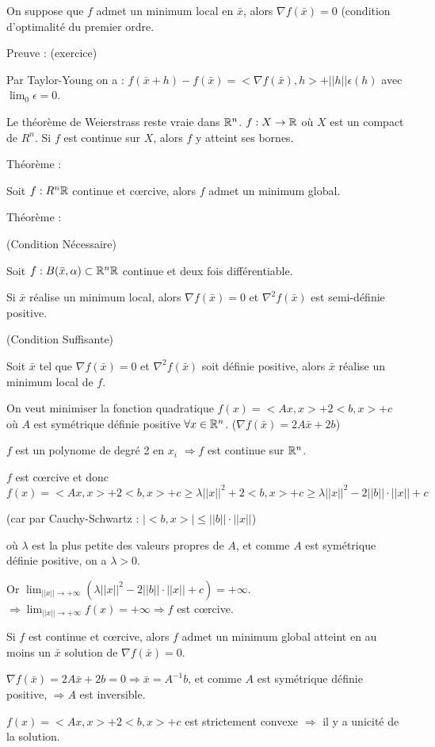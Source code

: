 		On suppose que $f$ admet un minimum local en $\bar{x}$, alors $\nabla f(\bar{x}) = 0$ (condition d'optimalité du premier ordre.
		
		Preuve : (exercice)
		
		Par Taylor-Young on a : $f(\bar{x}+h)-f(\bar{x}) = < \nabla f(\bar{x}) ,h> + ||h|| \epsilon(h)$ avec $\lim_0 \epsilon = 0$.
		
		
		Le théorème de Weierstrass reste vraie dans $\mathbb{R}^n$.
		$f:X\rightarrow \mathbb{R}$ où $X$ est un compact de $R^n$.
		Si $f$ est continue sur $X$, alors $f$ y atteint ses bornes.
		
		Théorème : 
		
		Soit $f:R^n \mathbb{R}$ continue et c\oe rcive, alors $f$ admet un minimum global.
		
		Théorème : 
		
		(Condition Nécessaire)
		
		Soit $f : B(\bar{x}, \alpha) \subset \mathbb{R}^n \mathbb{R}$ continue et deux fois différentiable.
		
		Si $\bar{x}$ réalise un minimum local, alors $\nabla f(\bar{x}) = 0$ et $\nabla^2 f(\bar{x})$ est semi-définie positive.
		
		(Condition Suffisante)
		
		Soit $\bar{x}$ tel que $\nabla f(\bar{x}) = 0$ et $\nabla^2 f(\bar{x})$ soit définie positive, alors $\bar{x}$ réalise un minimum local de $f$.
		
		\begin{exemple}
		
		On veut minimiser la fonction quadratique $f(x) = <Ax, x> +2<b, x> +c$ où $A$ est symétrique définie positive $\forall x \in \mathbb{R}^n$.
		($\nabla f(\bar{x}) = 2A\bar{x} +2b$)
		
		$f$ est un polynome de degré 2 en $x_i$ $\Rightarrow f$ est continue sur $\mathbb{R}^n$.
		
		$f$ est c\oe rcive et donc 
	 	$ f(x) = <Ax, x>  +2<b, x> +c \geq \lambda ||x||^2 + 2<b, x> +c \geq \lambda ||x||^2 - 2||b|| \cdot ||x|| +c $
		
		(car par Cauchy-Schwartz : $|<b, x>| \leq ||b|| \cdot ||x||$)
		
		où $\lambda$ est la plus petite des valeurs propres de $A$, et comme $A$ est symétrique définie positive, on a $\lambda >0$.
		
		Or $\displaystyle \lim_{||x|| \rightarrow +\infty}( \lambda ||x||^2 -2||b|| \cdot ||x|| +c) = +\infty$.
		$\displaystyle \Rightarrow \lim_{||x|| \rightarrow +\infty}f(x) = +\infty \Rightarrow f$ est c\oe rcive.
		
		Si $f$ est continue et c\oe rcive, alors $f$ admet un minimum global atteint en au moins un $\bar{x}$ solution de $\nabla f(\bar{x}) = 0$.
		
		$\nabla f(\bar{x}) = 2A\bar{x} +2b = 0 \Rightarrow \bar{x} = A^{-1} b$, et comme $A$ est symétrique définie positive, $\Rightarrow A$ est inversible.
		
		$f(x) = <Ax, x> +2<b, x> +c$ est strictement convexe $\Rightarrow$ il y a unicité de la solution.
		
		\end{exemple}
		
